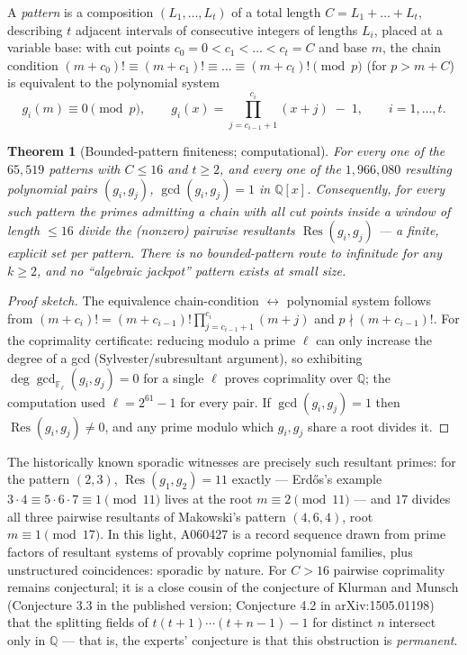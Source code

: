 \documentclass[11pt]{article}
\newtheorem{theorem}{Theorem}[section]
\theoremstyle{definition}
\theoremstyle{remark}
\newcommand{\Q}{\mathbb{Q}}
\newcommand{\F}{\mathbb{F}}
\DeclareMathOperator{\Res}{Res}
\begin{document}
A \emph{pattern} is a composition $(L_1, \dots, L_t)$ of a total length
$C = L_1 + \dots + L_t$, describing $t$ adjacent intervals of consecutive
integers of lengths $L_i$, placed at a variable base: with cut points
$c_0 = 0 < c_1 < \dots < c_t = C$ and base $m$, the chain condition
$(m + c_0)! \equiv (m + c_1)! \equiv \dots \equiv (m + c_t)! \pmod p$
(for $p > m + C$) is equivalent to the polynomial system
\[
  g_i(m) \equiv 0 \pmod p, \qquad
  g_i(x) = \prod_{j = c_{i-1}+1}^{c_i} (x + j) \; - \; 1, \qquad
  i = 1, \dots, t .
\]

\begin{theorem}[Bounded-pattern finiteness; computational]\label{thm:patterns}
For every one of the $65{,}519$ patterns with $C \le 16$ and $t \ge 2$, and
every one of the $1{,}966{,}080$ resulting polynomial pairs $(g_i, g_j)$,
$\gcd(g_i, g_j) = 1$ in $\Q[x]$. Consequently, for every such pattern the
primes admitting a chain with all cut points inside a window of length
$\le 16$ divide the (nonzero) pairwise resultants $\Res(g_i, g_j)$ --- a
finite, explicit set per pattern. There is no bounded-pattern route to
infinitude for any $k \ge 2$, and no ``algebraic jackpot'' pattern exists at
small size.
\end{theorem}

\begin{proof}[Proof sketch]
The equivalence chain-condition $\leftrightarrow$ polynomial system follows
from $(m + c_i)! = (m + c_{i-1})! \prod_{j = c_{i-1}+1}^{c_i} (m + j)$ and
$p \nmid (m + c_{i-1})!$. For the coprimality certificate: reducing modulo a
prime $\ell$ can only increase the degree of a gcd (Sylvester/subresultant
argument), so exhibiting $\deg \gcd_{\F_\ell}(g_i, g_j) = 0$ for a single
$\ell$ proves coprimality over $\Q$; the computation used
$\ell = 2^{61} - 1$ for every pair. If $\gcd(g_i, g_j) = 1$ then
$\Res(g_i, g_j) \ne 0$, and any prime modulo which $g_i, g_j$ share a root
divides it.
\end{proof}

The historically known sporadic witnesses are precisely such resultant
primes: for the pattern $(2, 3)$, $\Res(g_1, g_2) = 11$ exactly ---
Erd\H{o}s's example $3 \cdot 4 \equiv 5 \cdot 6 \cdot 7 \equiv 1 \pmod{11}$
lives at the root $m \equiv 2 \pmod{11}$ --- and $17$ divides all three
pairwise resultants of Makowski's pattern $(4, 6, 4)$, root
$m \equiv 1 \pmod{17}$. In this light, A060427 is a record sequence drawn
from prime factors of resultant systems of provably coprime polynomial
families, plus unstructured coincidences: sporadic by nature. For $C > 16$
pairwise coprimality remains conjectural; it is a close cousin of the
conjecture of Klurman and Munsch \cite{KM} (Conjecture 3.3 in the published
version; Conjecture 4.2 in arXiv:1505.01198) that the
splitting fields of $t(t+1)\cdots(t+n-1) - 1$ for distinct $n$ intersect
only in $\Q$ --- that is, the experts' conjecture is that this obstruction is
\emph{permanent}.
\end{document}
